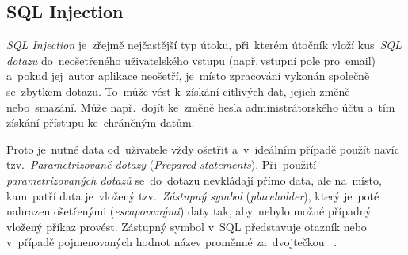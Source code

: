 \documentclass[11pt,a4paper]{report}
\begin{document}
            \subsection{SQL Injection}
                \emph{SQL Injection} je~zřejmě nejčastější typ útoku, při~kterém útočník vloží kus~\emph{SQL dotazu} do~neošetřeného uživatelského vstupu (např.\,vstupní pole pro~email) a~pokud jej~autor aplikace neošetří, je~místo zpracování vykonán společně se~zbytkem dotazu. To~může vést k~získání citlivých dat, jejich změně nebo~smazání. Může např.~dojít ke~změně hesla administrátorského účtu a~tím získání přístupu ke~chráněným datům.

                Proto je~nutné data od~uživatele vždy ošetřit a~v~ideálním případě použít navíc tzv.~\emph{Parametrizované dotazy} (\emph{Prepared statements}). Při~použití \emph{parametrizovaných dotazů} se~do~dotazu nevkládají přímo data, ale na~místo, kam~patří data je~vložený tzv.~\emph{Zástupný symbol} (\emph{placeholder}), který je~poté nahrazen ošetřenými (\emph{escapovanými}) daty tak, aby~nebylo možné případný vložený příkaz provést. Zástupný symbol v~SQL představuje otazník  nebo v~případě pojmenovaných hodnot název proměnné za~dvojtečkou ~\cite{graham2021ethical}.
                
\end{document}
